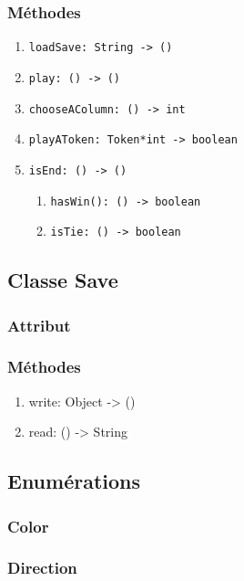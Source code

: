 \documentclass[11pt]{article}
\begin{document}
\subsubsection{Méthodes}
\label{sec:orgcd22710}
\begin{enumerate}
\item \texttt{loadSave: String -> ()}
\label{sec:org29bccb2}
\item \texttt{play: () -> ()}
\label{sec:org41f9772}
\item \texttt{chooseAColumn: () -> int}
\label{sec:org9747597}
\item \texttt{playAToken: Token*int -> boolean}
\label{sec:orgd875b91}
\item \texttt{isEnd: () -> ()}
\label{sec:orgdadc643}
\begin{enumerate}
\item \texttt{hasWin(): () -> boolean}
\label{sec:orgf6d1993}
\item \texttt{isTie: () -> boolean}
\label{sec:orgadea1d0}
\end{enumerate}
\end{enumerate}

\subsection{Classe Save\label{org7fda068}}
\label{sec:org54c34f3}
\subsubsection{Attribut}
\label{sec:org397adc2}
\subsubsection{Méthodes}
\label{sec:org6c1a313}
\begin{enumerate}
\item write: Object -> ()
\label{sec:org81ef721}
\item read: () -> String
\label{sec:org5715191}
\end{enumerate}
\subsection{Enumérations}
\label{sec:orge99671c}
\subsubsection{Color\label{org4fc9396}}
\label{sec:org13ed5b2}
\subsubsection{Direction\label{org010dbac}}
\label{sec:orga11bd23}
\end{document}

